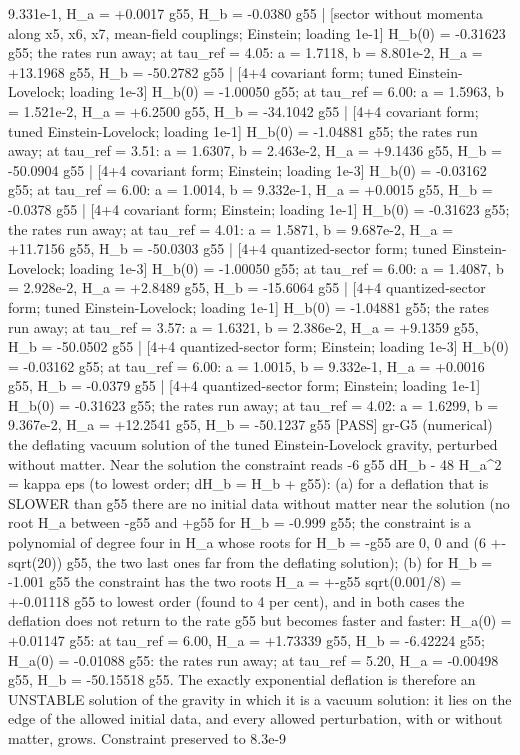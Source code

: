 \documentclass[
  10pt,
]{article}
\newenvironment{Shaded}{}{}
\newcommand{\NormalTok}[1]{#1}
\begin{document}
\begin{Shaded}
\begin{Highlighting}[]
\NormalTok{9.331e{-}1, H\_a = +0.0017 g55, H\_b = {-}0.0380 g55 | [sector without momenta along x5, x6, x7, mean{-}field couplings; Einstein; loading 1e{-}1] H\_b(0) = {-}0.31623 g55; the rates run away; at tau\_ref = 4.05: a = 1.7118, b = 8.801e{-}2, H\_a = +13.1968 g55, H\_b = {-}50.2782 g55 | [4+4 covariant form; tuned Einstein{-}Lovelock; loading 1e{-}3] H\_b(0) = {-}1.00050 g55; at tau\_ref = 6.00: a = 1.5963, b = 1.521e{-}2, H\_a = +6.2500 g55, H\_b = {-}34.1042 g55 | [4+4 covariant form; tuned Einstein{-}Lovelock; loading 1e{-}1] H\_b(0) = {-}1.04881 g55; the rates run away; at tau\_ref = 3.51: a = 1.6307, b = 2.463e{-}2, H\_a = +9.1436 g55, H\_b = {-}50.0904 g55 | [4+4 covariant form; Einstein; loading 1e{-}3] H\_b(0) = {-}0.03162 g55; at tau\_ref = 6.00: a = 1.0014, b = 9.332e{-}1, H\_a = +0.0015 g55, H\_b = {-}0.0378 g55 | [4+4 covariant form; Einstein; loading 1e{-}1] H\_b(0) = {-}0.31623 g55; the rates run away; at tau\_ref = 4.01: a = 1.5871, b = 9.687e{-}2, H\_a = +11.7156 g55, H\_b = {-}50.0303 g55 | [4+4 quantized{-}sector form; tuned Einstein{-}Lovelock; loading 1e{-}3] H\_b(0) = {-}1.00050 g55; at tau\_ref = 6.00: a = 1.4087, b = 2.928e{-}2, H\_a = +2.8489 g55, H\_b = {-}15.6064 g55 | [4+4 quantized{-}sector form; tuned Einstein{-}Lovelock; loading 1e{-}1] H\_b(0) = {-}1.04881 g55; the rates run away; at tau\_ref = 3.57: a = 1.6321, b = 2.386e{-}2, H\_a = +9.1359 g55, H\_b = {-}50.0502 g55 | [4+4 quantized{-}sector form; Einstein; loading 1e{-}3] H\_b(0) = {-}0.03162 g55; at tau\_ref = 6.00: a = 1.0015, b = 9.332e{-}1, H\_a = +0.0016 g55, H\_b = {-}0.0379 g55 | [4+4 quantized{-}sector form; Einstein; loading 1e{-}1] H\_b(0) = {-}0.31623 g55; the rates run away; at tau\_ref = 4.02: a = 1.6299, b = 9.367e{-}2, H\_a = +12.2541 g55, H\_b = {-}50.1237 g55}
\NormalTok{[PASS] gr{-}G5  (numerical) the deflating vacuum solution of the tuned Einstein{-}Lovelock gravity, perturbed without matter. Near the solution the constraint reads {-}6 g55 dH\_b {-} 48 H\_a\^{}2 = kappa eps (to lowest order; dH\_b = H\_b + g55): (a) for a deflation that is SLOWER than g55 there are no initial data without matter near the solution (no root H\_a between {-}g55 and +g55 for H\_b = {-}0.999 g55; the constraint is a polynomial of degree four in H\_a whose roots for H\_b = {-}g55 are 0, 0 and (6 +{-} sqrt(20)) g55, the two last ones far from the deflating solution); (b) for H\_b = {-}1.001 g55 the constraint has the two roots H\_a = +{-}g55 sqrt(0.001/8) = +{-}0.01118 g55 to lowest order (found to 4 per cent), and in both cases the deflation does not return to the rate g55 but becomes faster and faster: H\_a(0) = +0.01147 g55: at tau\_ref = 6.00, H\_a = +1.73339 g55, H\_b = {-}6.42224 g55; H\_a(0) = {-}0.01088 g55: the rates run away; at tau\_ref = 5.20, H\_a = {-}0.00498 g55, H\_b = {-}50.15518 g55. The exactly exponential deflation is therefore an UNSTABLE solution of the gravity in which it is a vacuum solution: it lies on the edge of the allowed initial data, and every allowed perturbation, with or without matter, grows. Constraint preserved to 8.3e{-}9}
\end{Highlighting}
\end{Shaded}
\end{document}
